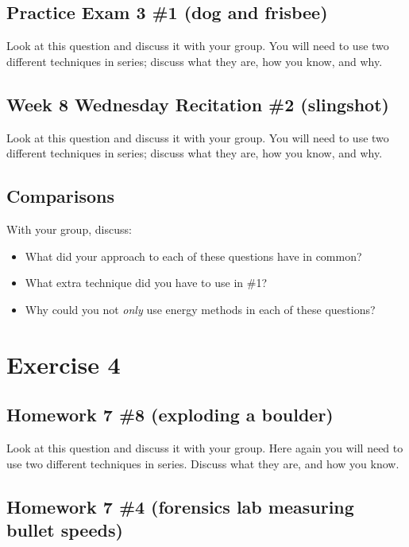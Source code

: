 \documentclass[12pt]{article}
\begin{document}
\subsection{Practice Exam 3 \#1 (dog and frisbee)}

Look at this question and discuss it with your group. You will need to use two different techniques in series; discuss what they are, how you know, and why.

\subsection{Week 8 Wednesday Recitation \#2 (slingshot)}

Look at this question and discuss it with your group. You will need to use two different techniques in series; discuss what they are, how you know, and why.

\subsection{Comparisons}

With your group, discuss:

\begin{itemize}
	\item What did your approach to each of these questions have in common?
	\item What extra technique did you have to use in \#1?
	\item Why could you not {\it only} use energy methods in each of these questions?
\end{itemize}


\newpage

\section{Exercise 4}

\subsection{Homework 7 \#8 (exploding a boulder)}

Look at this question and discuss it with your group. Here again you will need to use two different techniques in series. Discuss what they are, and how you know.

\subsection{Homework 7 \#4 (forensics lab measuring bullet speeds)}
\end{document}
